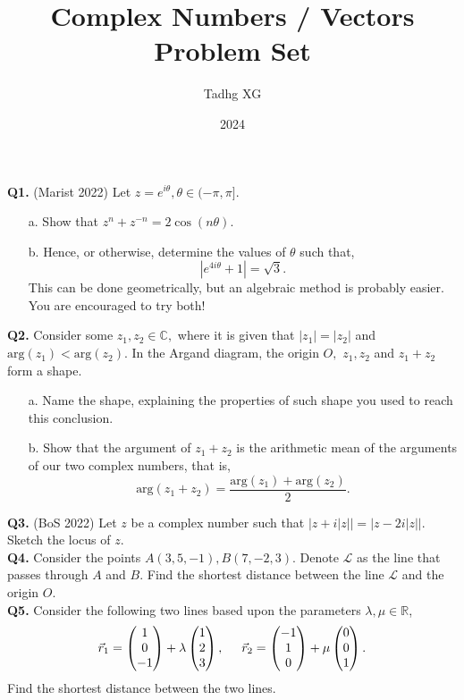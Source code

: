 \documentclass{article}
\title{Complex Numbers / Vectors Problem Set}
\author{Tadhg XG}
\date{2024}
\begin{document}
\maketitle

\textbf{Q1.} (Marist 2022) Let $z = e^{i\theta}, \theta \in (-\pi, \pi].$ 
\begin{enumerate}
    \item[a.] Show that $z^n+z^{-n} = 2 \cos{(n\theta)}.$
    \item[b.] Hence, or otherwise, determine the values of $\theta$ such that,
$$| e^{4i\theta} + 1| = \sqrt{3}.$$
            This can be done geometrically, but an algebraic method is probably easier. You are encouraged to try both!
\end{enumerate}

\textbf{Q2.} Consider some $z_1, z_2 \in \mathbb{C},$ where it is given that $|z_1| = |z_2|$ and $\text{arg}(z_1) < \text{arg}(z_2).$ In the Argand diagram, the origin $O,$ $z_1, z_2$ and $z_1 + z_2$ form a shape.
\begin{enumerate}
    \item[a.] Name the shape, explaining the properties of such shape you used to reach this conclusion.
    \item[b.] Show that the argument of $z_1 + z_2$ is the arithmetic mean of the arguments of our two complex numbers, that is, $$\text{arg}(z_1+z_2) = \frac{\text{arg}(z_1)+\text{arg}(z_2)}{2}. $$
\end{enumerate}

\textbf{Q3.} (BoS 2022) Let $z$ be a complex number such that $|z+i|z||=|z-2i|z||.$ Sketch the locus of $z.$ \\

\textbf{Q4.} Consider the points $A(3,5,-1), B(7,-2,3).$ Denote $\mathcal{L}$ as the line that passes through $A$ and $B.$ Find the shortest distance between the line $\mathcal{L}$ and the origin $O$. \\

\textbf{Q5.} Consider the following two lines based upon the parameters $\lambda, \mu \in \mathbb{R}$,
$$
\vec{r}_1 = 
\begin{pmatrix}
    1 \\
    0 \\
    -1
\end{pmatrix} + \lambda
\begin{pmatrix}
    1 \\
    2 \\ 
    3
\end{pmatrix}, \hspace{0.5cm}
\vec{r}_2 =
\begin{pmatrix}
    -1 \\
    1 \\
    0
\end{pmatrix} + \mu
\begin{pmatrix}
    0 \\
    0 \\
    1
\end{pmatrix}.
$$
Find the shortest distance between the two lines. \\
\end{document}
